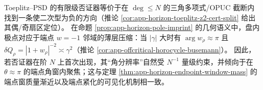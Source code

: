 \begin{remark}\label{rem:app-horizon-toeplitz-witness-endpoint-focus}
Toeplitz--PSD 的有限级否证器等价于在 \(\deg\le N\) 的三角多项式/OPUC 截断内找到一条使二次型为负的方向（推论 \ref{cor:app-horizon-toeplitz-z2-cert-split} 给出其偶/奇扇区定位）。
在命题 \ref{prop:app-horizon-pole-imprint} 的几何语义中，盘内极点对应于端点 \(w=-1\) 邻域的薄层压缩：当 \(|\gamma|\) 大时有 \(\arg w_\rho\approx\pi\) 且 \(\delta Q_\rho=|1+w_\rho|^{-2}\asymp \gamma^2\)（推论 \ref{cor:app-offcritical-horocycle-busemann}）。
因此，若否证器在阶 \(N\) 上首次出现，其“角分辨率”自然受 \(N^{-1}\) 量级约束，并倾向于在 \(\theta\approx\pi\) 的端点角窗内聚焦；这与定理 \ref{thm:app-horizon-endpoint-window-mass} 的端点窗质量渐近以及端点紧化的可见化机制相一致。
\end{remark}

\endinput


\endinput
